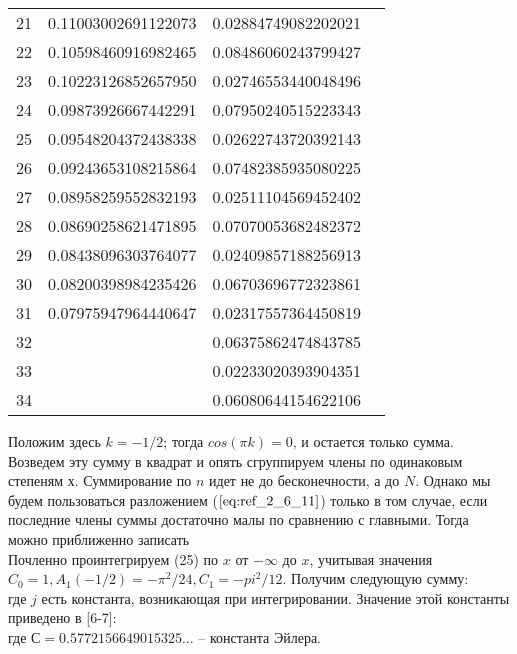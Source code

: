 \begin{table}[]
\begin{center}
\begin{tabular}{|c|c|c|c|}
21 & 0.11003002691122073 & 0.02884749082202021 &                      \\
22 & 0.10598460916982465 & 0.08486060243799427 &                      \\
23 & 0.10223126852657950 & 0.02746553440048496 &                      \\
24 & 0.09873926667442291 & 0.07950240515223343 &                      \\
25 & 0.09548204372438338 & 0.02622743720392143 &                      \\
26 & 0.09243653108215864 & 0.07482385935080225 &                      \\
27 & 0.08958259552832193 & 0.02511104569452402 &                      \\
28 & 0.08690258621471895 & 0.07070053682482372 &                      \\
29 & 0.08438096303764077 & 0.02409857188256913 &                      \\
30 & 0.08200398984235426 & 0.06703696772323861 &                      \\
31 & 0.07975947964440647 & 0.02317557364450819 &                      \\
32 &                     & 0.06375862474843785 &                      \\
33 &                     & 0.02233020393904351 &                      \\
34 &                     & 0.06080644154622106 &                      \\
\hline
\end{tabular}
\end{center}
\end{table}

\begin{equation}
\label{eq:ref_2_6_11}
\end{equation}
Положим здесь $k = -1/2$; тогда $cos(\pi k) = 0$, и остается только сумма. Возведем
эту сумму в квадрат и опять сгруппируем члены по одинаковым степеням $х$.
Суммирование по $n$ идет не до бесконечности, а до $N$. Однако мы будем
пользоваться разложением ($\ref{eq:ref_2_6_11}$) только в том случае, если последние члены
суммы достаточно малы по сравнению с главными. Тогда можно приближенно
записать
\begin{equation}
\label{eq:ref_2_6_12}
\end{equation}
Почленно проинтегрируем (25) по $x$ от $-\infty$ до $x$, учитывая значения
$C_0=1, A_1(-1/2)=-\pi^2/24, C_1=-pi^2/12$. Получим следующую сумму:
\begin{equation}
\label{eq:ref_2_6_13}
\end{equation}
где $j$ есть константа, возникающая при интегрировании. Значение этой
константы приведено в [6-7]:
\begin{equation}
\label{eq:ref_2_6_14}
\end{equation}
где $С = 0.5772156649015325...$ – константа Эйлера.

